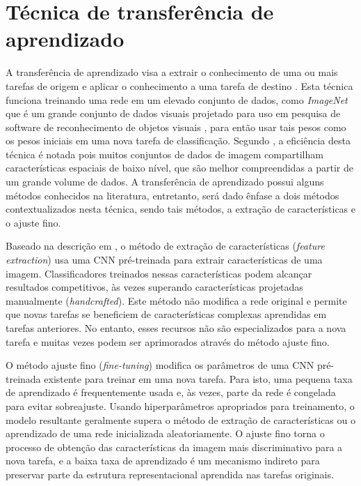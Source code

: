 \documentclass[
	12pt,				%
	oneside,			%
	a4paper,			%
	english,			%
	brazil				%
	]{abntex2ppgsi}
\begin{document}
\section{Técnica de transferência de aprendizado}
A transferência de aprendizado visa a extrair o conhecimento de uma ou mais tarefas de origem e aplicar o conhecimento a uma tarefa de destino \cite{pan2009survey}. Esta técnica funciona treinando uma rede em um elevado conjunto de dados, como \textit{ImageNet} que é um grande conjunto de dados visuais projetado para uso em pesquisa de software de reconhecimento de objetos visuais \cite{russakovsky2015imagenet}, para então usar tais pesos como os pesos iniciais em uma nova tarefa de classificação. Segundo , a eficiência desta técnica é notada pois muitos conjuntos de dados de imagem compartilham características espaciais de baixo nível, que são melhor compreendidas a partir de um grande volume de dados. A transferência de aprendizado possui alguns métodos conhecidos na literatura, entretanto, será dado ênfase a dois métodos contextualizados nesta técnica, sendo tais métodos, a extração de características e o ajuste fino. 

Baseado na descrição em , o método de extração de características (\textit{feature extraction}) usa uma CNN pré-treinada para extrair características de uma imagem. Classificadores treinados nessas características podem alcançar resultados competitivos, às vezes superando características projetadas manualmente (\textit{handcrafted}). Este método não modifica a rede original e permite que novas tarefas se beneficiem de características complexas aprendidas em tarefas anteriores. No entanto, esses recursos não são especializados para a nova tarefa e muitas vezes podem ser aprimorados através do método ajuste fino.

O método ajuste fino (\textit{fine-tuning}) modifica os parâmetros de uma CNN pré-treinada existente para treinar em uma nova tarefa. Para isto, uma pequena taxa de aprendizado é frequentemente usada e, às vezes, parte da rede é congelada para evitar sobreajuste. Usando hiperparâmetros apropriados para treinamento, o modelo resultante geralmente supera o método de extração de características ou o aprendizado de uma rede inicializada aleatoriamente. O ajuste fino torna o processo de obtenção das características da imagem mais discriminativo para a nova tarefa, e a baixa taxa de aprendizado é um mecanismo indireto para preservar parte da estrutura representacional aprendida nas tarefas originais.
\end{document}

